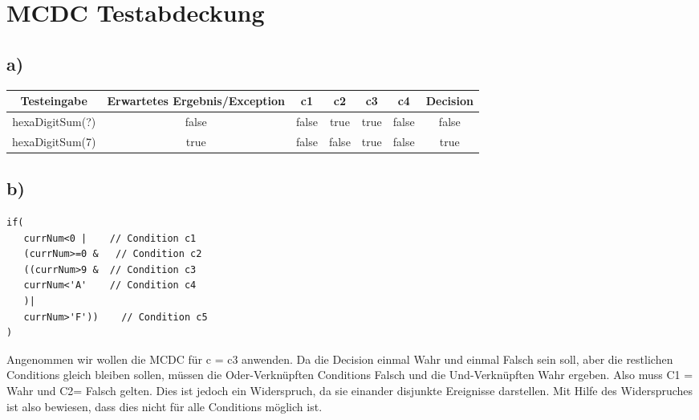 \lstset{language=Java,
	showspaces=false,
	showtabs=false,
	breaklines=true,
	showstringspaces=false,
	breakatwhitespace=true,
}



\chapter{MCDC Testabdeckung}
\section{a)}
\begin{center}
	\begin{tabular}{ c c c c c c c }
		\hline
		Testeingabe & Erwartetes Ergebnis/Exception & c1 & c2 & c3 & c4 & Decision  \\
		\hline 
		 hexaDigitSum(?)& false & false & true & true & false & false  \\  
		 hexaDigitSum(7)& true & false & false & true & false & true  
	\end{tabular}
\end{center}

\section{b)}

\begin{lstlisting}[caption = {Conditions der aufgabe 2b}]
if(
   currNum<0 |    // Condition c1
   (currNum>=0 &   // Condition c2
   ((currNum>9 &  // Condition c3
   currNum<'A'    // Condition c4
   )|
   currNum>'F'))    // Condition c5
)
\end{lstlisting}

Angenommen wir wollen die MCDC für c = c3 anwenden. Da die Decision einmal Wahr und einmal Falsch sein soll, aber die restlichen Conditions gleich bleiben sollen,
müssen die Oder-Verknüpften Conditions Falsch und die Und-Verknüpften Wahr ergeben. Also muss C1 = Wahr und C2= Falsch gelten. Dies ist jedoch ein Widerspruch, da sie einander disjunkte Ereignisse darstellen. Mit Hilfe des Widerspruches ist also bewiesen, dass dies nicht für alle Conditions möglich ist.


